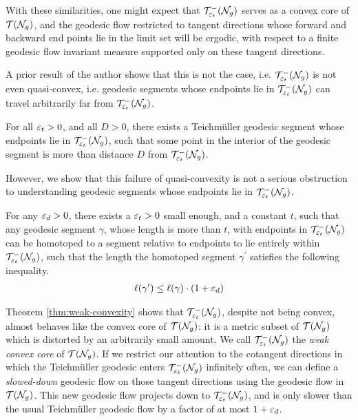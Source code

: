 With these similarities, one might expect that $\mathcal{T}_{\varepsilon_t}^{-}(\mathcal{N}_g)$ serves as a convex core of $\mathcal{T}(\mathcal{N}_g)$, and the geodesic flow restricted to tangent directions whose forward and backward end points lie in the limit set will be ergodic, with respect to a finite geodesic flow invariant measure supported only on these tangent directions.

A prior result of the author shows that this is not the case, i.e. $\mathcal{T}_{\varepsilon_t}^{-}(\mathcal{N}_g)$ is not even quasi-convex, i.e. geodesic segments whose endpoints lie in $\mathcal{T}_{\varepsilon_t}^{-}(\mathcal{N}_g)$ can travel arbitrarily far from $\mathcal{T}_{\varepsilon_t}^{-}(\mathcal{N}_g)$.

\begin{theorem}
  For all $\varepsilon_t > 0$, and all $D > 0$, there exists a Teichmüller geodesic segment whose endpoints lie in $\mathcal{T}_{\varepsilon_t}^{-}(\mathcal{N}_g)$, such that some point in the interior of the geodesic segment is more than distance $D$ from $\mathcal{T}_{\varepsilon_t}^{-}(\mathcal{N}_g)$.
\end{theorem}

However, we show that this failure of quasi-convexity is not a serious obstruction to understanding geodesic segments whose endpoints lie in $\mathcal{T}_{\varepsilon_t}^{-}(\mathcal{N}_g)$.

\begingroup
\def\thetheorem{\ref{thm:weak-convexity}}
\begin{theorem}
  For any $\varepsilon_d > 0$, there exists a $\varepsilon_t > 0$ small enough, and a constant $t$, such that any geodesic segment $\gamma$, whose length is more than $t$, with endpoints in $\mathcal{T}_{\varepsilon_t}^{-}(\mathcal{N}_g)$ can be homotoped to a segment relative to endpoints to lie entirely within $\mathcal{T}_{\varepsilon_t}^{-}(\mathcal{N}_g)$, such that the length the homotoped segment $\gamma^{\prime}$ satisfies the following inequality.
  \begin{align*}
    \ell(\gamma^{\prime}) \leq \ell(\gamma) \cdot (1 + \varepsilon_d)
  \end{align*}
\end{theorem}
\addtocounter{theorem}{-1}
\endgroup

Theorem \ref{thm:weak-convexity} shows that $\mathcal{T}_{\varepsilon_t}^{-}(\mathcal{N}_g)$, despite not being convex, almost behaves like the convex core of $\mathcal{T}(\mathcal{N}_g)$: it is a metric subset of $\mathcal{T}(\mathcal{N}_g)$ which is distorted by an arbitrarily small amount.
We call $\mathcal{T}_{\varepsilon_t}^{-}(\mathcal{N}_g)$ the \emph{weak convex core} of $\mathcal{T}(\mathcal{N}_g)$.
If we restrict our attention to the cotangent directions in which the Teichmüller geodesic enters $\mathcal{T}_{\varepsilon_t}^{-}(\mathcal{N}_g)$ infinitely often, we can define a \emph{slowed-down} geodesic flow on those tangent directions using the geodesic flow in $\mathcal{T}(\mathcal{N}_g)$.
This new geodesic flow projects down to $\mathcal{T}_{\varepsilon_t}^{-}(\mathcal{N}_g)$, and is only slower than the usual Teichmüller geodesic flow by a factor of at most $1 + \varepsilon_d$.

